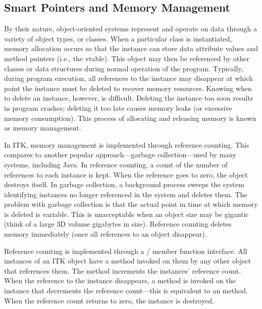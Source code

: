 \subsection{Smart Pointers and Memory Management}
\label{sec:SmartPointers}


By their nature, object-oriented systems represent and operate on data through
a variety of object types, or classes. When a particular class is
instantiated, memory allocation occurs so that the instance can store data
attribute values and method pointers (i.e., the vtable).
This object may then be referenced by other classes or
data structures during normal operation of the program. Typically, during
program execution, all references to the instance may disappear at which point
the instance must be deleted to recover memory resources. Knowing when to
delete an instance, however, is difficult. Deleting the instance too soon
results in program crashes; deleting it too late causes memory leaks (or
excessive memory consumption). This process of allocating and
releasing memory is known as memory management.

In ITK, memory management is implemented through reference counting. This
compares to another popular approach---garbage collection---used
 by many systems, including Java.
In reference counting, a count of the number of
references to each instance is kept. When the reference goes to zero, the
object destroys itself. In garbage collection, a background process sweeps
the system identifying instances no longer referenced in the system and
deletes them. The problem with garbage collection is that the actual point in
time at which memory is deleted is variable. This is unacceptable when an
object size may be gigantic (think of a large 3D volume gigabytes in
size). Reference counting deletes memory immediately (once all references to
an object disappear).

Reference counting is implemented through a /
member function interface. All instances of an ITK object have a
 method invoked on them by any other object that references
them. The  method increments the instances' reference
count. When the reference to the instance disappears, a 
method is invoked on the instance that decrements the reference count---this
is equivalent to an  method. When the reference count
returns to zero, the instance is destroyed.

